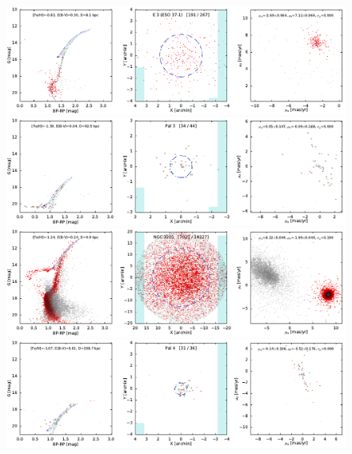\documentclass[usenatbib]{mnras}
\begin{document}
\clearpage\begin{figure}
\contcaption{}
\includegraphics{figs/E_3.pdf}
\includegraphics{figs/Pal_3.pdf}
\includegraphics{figs/NGC_3201.pdf}
\includegraphics{figs/Pal_4.pdf}
\end{figure}
\end{document}
